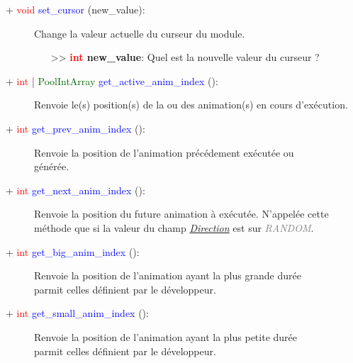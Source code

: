 \documentclass[a4paper, 11pt]{article}
\begin{document}
	\begin{description}
		\item [+ \textcolor{red}{void} \textcolor{blue}{set\_cursor} (new\_value):] Change la valeur 
		actuelle du curseur du module.
		\begin{itemize}
			\item [>> \textbf{\textcolor{red}{int} new\_value}:] Quel est la nouvelle valeur du curseur ?\\
		\end{itemize}
	\end{description}
	\begin{description}
		\item [+ \textcolor{red}{int} | \textcolor{darkgreen}{PoolIntArray} \textcolor{blue}
		{get\_active\_anim\_index} ():] Renvoie le(s) position(s) de la ou des animation(s) en cours 
		d'exécution.\\
	\end{description}
	\begin{description}
		\item [+ \textcolor{red}{int} \textcolor{blue}{get\_prev\_anim\_index} ():] Renvoie la position de 
		l'animation précédement exécutée ou \\générée.\\
	\end{description}
	\begin{description}
		\item [+ \textcolor{red}{int} \textcolor{blue}{get\_next\_anim\_index} ():] Renvoie la position du 
		future animation à exécutée. N'appelée cette méthode que si la valeur du champ
		\textit{\hyperlink{direction}{Direction}} est sur \textit{\textcolor{gray}{RANDOM}}.\\
	\end{description}
	\begin{description}
		\item [+ \textcolor{red}{int} \textcolor{blue}{get\_big\_anim\_index} ():] Renvoie la position de
		l'animation ayant la plus grande durée \\parmit celles définient par le développeur.\\
	\end{description}
	\begin{description}
		\item [+ \textcolor{red}{int} \textcolor{blue}{get\_small\_anim\_index} ():] Renvoie la position de 
		l'animation ayant la plus petite durée \\parmit celles définient par le développeur.\\
	\end{description}
\end{document}

